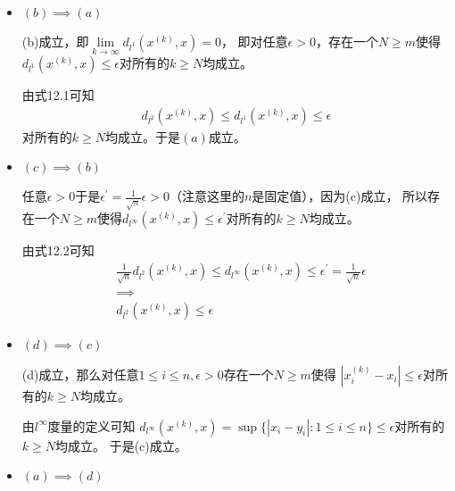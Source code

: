 \documentclass{article}
\begin{document}
\begin{itemize}
      \item $(b) \implies (a)$

            (b)成立，即$\lim\limits_{k \to \infty}d_{l^1}(x^{(k)}, x) = 0$，
            即对任意$\epsilon > 0$，存在一个$N \geq m$使得$d_{l^1}(x^{(k)}, x) \leq \epsilon$对所有的$k \geq N$均成立。

            由式12.1可知
            \begin{align*}
                  d_{l^2}(x^{(k)}, x) \leq d_{l^1}(x^{(k)}, x) \leq \epsilon
            \end{align*}
            对所有的$k \geq N$均成立。于是$(a)$成立。

      \item $(c) \implies (b)$

            任意$\epsilon > 0$于是$\epsilon^\prime = \frac{1}{\sqrt{n}}\epsilon > 0$（注意这里的$n$是固定值），因为(c)成立，
            所以存在一个$N \geq m$使得$d_{l^\infty}(x^{(k)}, x) \leq \epsilon^\prime$对所有的$k \geq N$均成立。

            由式12.2可知
            \begin{align*}
                   & \frac{1}{\sqrt{n}}d_{l^2}(x^{(k)}, x) \leq d_{l^\infty}(x^{(k)}, x) \leq \epsilon^\prime = \frac{1}{\sqrt{n}}\epsilon \\
                   & \implies                                                                                                              \\
                   & d_{l^2}(x^{(k)}, x) \leq \epsilon
            \end{align*}

      \item $(d) \implies (c)$

            (d)成立，那么对任意$1 \leq i \leq n, \epsilon > 0$存在一个$N \geq m$使得
            $|x_i^{(k)} - x_i| \leq \epsilon$对所有的$k \geq N$均成立。

            由$l^{\infty}$度量的定义可知
            $d_{l^\infty}(x^{(k)}, x) = \sup\{|x_i - y_i|: 1 \leq i \leq n\} \leq \epsilon$对所有的$k \geq N$均成立。
            于是(c)成立。

      \item $(a) \implies (d)$


\end{itemize}
\end{document}
